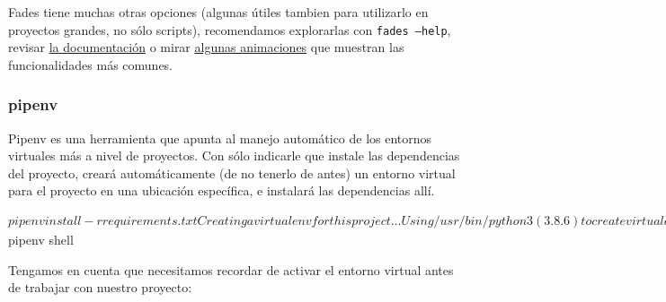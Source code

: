 Fades tiene muchas otras opciones (algunas útiles tambien para utilizarlo en proyectos grandes, no sólo scripts), recomendamos explorarlas con \texttt{fades --help}, revisar \href{https://fades.readthedocs.io/en/release-9.0/}{la documentación} o mirar \href{https://github.com/PyAr/fades/blob/master/resources/gifs/gifs.rst}{algunas animaciones} que muestran las funcionalidades más comunes.


\subsubsection{pipenv}

Pipenv es una herramienta que apunta al manejo automático de los entornos virtuales más a nivel de proyectos. Con sólo indicarle que instale las dependencias del proyecto, creará automáticamente (de no tenerlo de antes) un entorno virtual para el proyecto en una ubicación específica, e instalará las dependencias allí.

\begin{shell}
$ pipenv install -r requirements.txt 
Creating a virtualenv for this project…
Using /usr/bin/python3 (3.8.6) to create virtualenv…
⠋created virtual environment CPython3.8.6.final.0-64 in 104ms
  creator CPython3Posix(dest=/home/facundo/.local/share/virtualenvs/trunk-qJfLQWAx, clear=False, global=False)
  seeder FromAppData(download=False, pip=bundle, setuptools=bundle, wheel=bundle, via=copy, app_data_dir=/home/facundo/.local/share/virtualenv)
    added seed packages: pip==20.1.1, pkg_resources==0.0.0, setuptools==44.0.0, wheel==0.34.2
  activators BashActivator,CShellActivator,FishActivator,PowerShellActivator,PythonActivator,XonshActivator
Virtualenv location: /home/facundo/.local/share/virtualenvs/trunk-qJfLQWAx
Creating a Pipfile for this project…
Requirements file provided! Importing into Pipfile…
Pipfile.lock not found, creating…
Locking [dev-packages] dependencies…
Locking [packages] dependencies…
Updated Pipfile.lock (00d0fa)!
Installing dependencies from Pipfile.lock (00d0fa)…
  🐍   ▉▉▉▉▉▉▉▉▉▉▉▉▉▉▉▉▉▉▉▉▉▉▉▉▉▉▉▉▉▉▉▉ 4/4 — 00:00:04
To activate this project's virtualenv, run the following:
‎  $ pipenv shell
\end{shell}

Tengamos en cuenta que necesitamos recordar de activar el entorno virtual antes de trabajar con nuestro proyecto:


